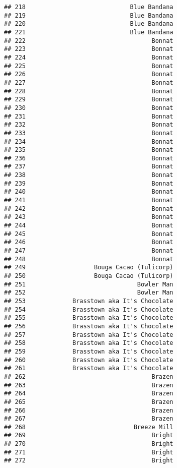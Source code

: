 \documentclass[
]{article}
\begin{document}
\begin{verbatim}
## 218                             Blue Bandana
## 219                             Blue Bandana
## 220                             Blue Bandana
## 221                             Blue Bandana
## 222                                   Bonnat
## 223                                   Bonnat
## 224                                   Bonnat
## 225                                   Bonnat
## 226                                   Bonnat
## 227                                   Bonnat
## 228                                   Bonnat
## 229                                   Bonnat
## 230                                   Bonnat
## 231                                   Bonnat
## 232                                   Bonnat
## 233                                   Bonnat
## 234                                   Bonnat
## 235                                   Bonnat
## 236                                   Bonnat
## 237                                   Bonnat
## 238                                   Bonnat
## 239                                   Bonnat
## 240                                   Bonnat
## 241                                   Bonnat
## 242                                   Bonnat
## 243                                   Bonnat
## 244                                   Bonnat
## 245                                   Bonnat
## 246                                   Bonnat
## 247                                   Bonnat
## 248                                   Bonnat
## 249                   Bouga Cacao (Tulicorp)
## 250                   Bouga Cacao (Tulicorp)
## 251                               Bowler Man
## 252                               Bowler Man
## 253             Brasstown aka It's Chocolate
## 254             Brasstown aka It's Chocolate
## 255             Brasstown aka It's Chocolate
## 256             Brasstown aka It's Chocolate
## 257             Brasstown aka It's Chocolate
## 258             Brasstown aka It's Chocolate
## 259             Brasstown aka It's Chocolate
## 260             Brasstown aka It's Chocolate
## 261             Brasstown aka It's Chocolate
## 262                                   Brazen
## 263                                   Brazen
## 264                                   Brazen
## 265                                   Brazen
## 266                                   Brazen
## 267                                   Brazen
## 268                              Breeze Mill
## 269                                   Bright
## 270                                   Bright
## 271                                   Bright
## 272                                   Bright

\end{verbatim}
\end{document}
